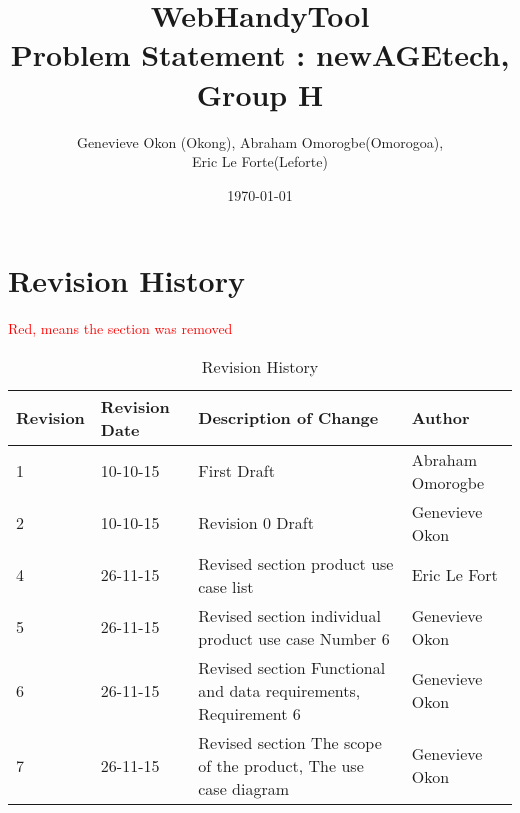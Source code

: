 \documentclass[titlepage]{article}
\begin{document}
\title{WebHandyTool \\
 Problem Statement : newAGEtech, Group H }
\author{Genevieve Okon (Okong), Abraham Omorogbe(Omorogoa),\\
 Eric Le Forte(Leforte)}
\date{\today}
\maketitle

\tableofcontents
\listoffigures
\listoftables


\pagebreak


\section{Revision History}
\textcolor{red}{Red, means the section was removed}
\begin{table}[h!]
	\begin{tabular}{| p{5cm} | p{5cm} | p{5cm} |p{5cm} |}    \hline
Revision  &Revision Date &Description of Change &Author\\ \hline
1& 10-10-15&First Draft&Abraham Omorogbe\\ \hline
2& 10-10-15& Revision 0 Draft&Genevieve Okon\\ \hline
4& 26-11-15& Revised section product use case list &Eric Le Fort\\ \hline
5& 26-11-15& Revised section  individual product use case Number 6&Genevieve Okon\\ \hline
6& 26-11-15& Revised section Functional and data requirements, Requirement 6&Genevieve Okon\\ \hline
7& 26-11-15& Revised section The scope of the  product, The use case diagram &Genevieve Okon\\ \hline

       \end{tabular}
       
       \caption{Revision History}
       \label{table:Revision History}
\end{table}

\end{document}
